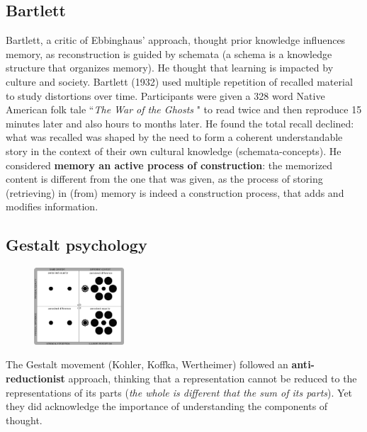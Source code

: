 \subsection{Bartlett}
Bartlett, a critic of Ebbinghaus' approach, thought prior knowledge influences memory, as reconstruction is guided by schemata (a schema is a knowledge structure that organizes memory). He thought that learning is impacted by culture and society.
Bartlett (1932) used multiple repetition of recalled material to study distortions over time. Participants were given a 328 word Native American folk tale ``\textit{The War of the Ghosts} \notet" to read twice and then reproduce 15 minutes later and also hours to months later. He found the total recall declined: what was recalled was shaped by the need to form a coherent understandable story in the context of their own cultural knowledge (schemata-concepts). He considered \textbf{memory an active process of construction}: the memorized content is different from the one that was given, as the process of storing (retrieving) in (from) memory is indeed a construction process, that adds and modifies information.


\subsection{Gestalt psychology}
\begin{figure}
  \centering
  \includegraphics[width=0.3\textwidth]{images/gestalt_2.png}
  \caption{}
  \label{fig:gestalt_2}
\end{figure}

The Gestalt movement (Kohler, Koffka, Wertheimer) followed an 
\textbf{anti-reductionist} approach, thinking that a representation cannot be reduced to the representations of its parts (\textit{the whole is different that the sum of its parts}). Yet they did acknowledge the importance of understanding the components of thought.\\

